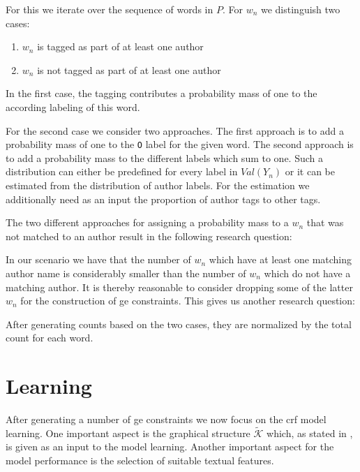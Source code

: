 For this we iterate over the sequence of words in $P$.
For $w_n$ we distinguish two cases:
\begin{enumerate}
  \item $w_n$ is tagged as part of at least one author
  \item $w_n$ is not tagged as part of at least one author
\end{enumerate}

In the first case, the tagging contributes a probability mass of one to the according labeling of this word.

For the second case we consider two approaches.
The first approach is to add a probability mass of one to the \texttt{O} label for the given word.
The second approach is to add a probability mass to the different labels which sum to one.
Such a distribution can either be predefined for every label in $Val(Y_n)$ or it can be estimated from the distribution of author labels.
For the estimation we additionally need as an input the proportion of author tags to other tags.


The two different approaches for assigning a probability mass to a $w_n$ that was not matched to an author result in the following research question:
\researchquestionthree%

In our scenario we have that the number of $w_n$ which have at least one matching author name is considerably smaller than the number of $w_n$ which do not have a matching author.
It is thereby reasonable to consider dropping some of the latter $w_n$ for the construction of \gls{ge} constraints.
This gives us another research question:
\researchquestionfour%

\bigskip

After generating counts based on the two cases, they are normalized by the total count for each word.

\section{Learning }\label{sec:ae-learning-crfs}

After generating a number of \gls{ge} constraints we now focus on the \gls{crf} model learning.
One important aspect is the graphical structure $\mathcal{\tilde{K}}$ which, as stated in , is given as an input to the model learning.
Another important aspect for the model performance is the selection of suitable textual features.

